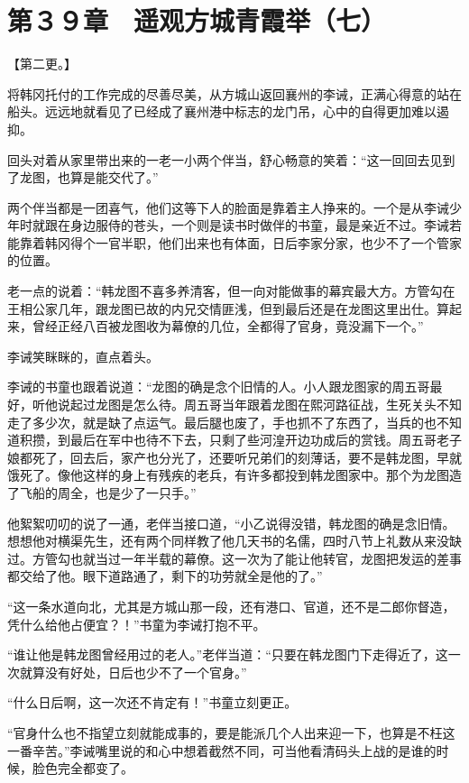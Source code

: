 \section{第３９章　遥观方城青霞举（七）}

【第二更。】

将韩冈托付的工作完成的尽善尽美，从方城山返回襄州的李诫，正满心得意的站在船头。远远地就看见了已经成了襄州港中标志的龙门吊，心中的自得更加难以遏抑。

回头对着从家里带出来的一老一小两个伴当，舒心畅意的笑着：“这一回回去见到了龙图，也算是能交代了。”

两个伴当都是一团喜气，他们这等下人的脸面是靠着主人挣来的。一个是从李诫少年时就跟在身边服侍的苍头，一个则是读书时做伴的书童，最是亲近不过。李诫若能靠着韩冈得个一官半职，他们出来也有体面，日后李家分家，也少不了一个管家的位置。

老一点的说着：“韩龙图不喜多养清客，但一向对能做事的幕宾最大方。方管勾在王相公家几年，跟龙图已故的内兄交情匪浅，但到最后还是在龙图这里出仕。算起来，曾经正经八百被龙图收为幕僚的几位，全都得了官身，竟没漏下一个。”

李诫笑眯眯的，直点着头。

李诫的书童也跟着说道：“龙图的确是念个旧情的人。小人跟龙图家的周五哥最好，听他说起过龙图是怎么待。周五哥当年跟着龙图在熙河路征战，生死关头不知走了多少次，就是缺了点运气。最后腿也废了，手也抓不了东西了，当兵的也不知道积攒，到最后在军中也待不下去，只剩了些河湟开边功成后的赏钱。周五哥老子娘都死了，回去后，家产也分光了，还要听兄弟们的刻薄话，要不是韩龙图，早就饿死了。像他这样的身上有残疾的老兵，有许多都投到韩龙图家中。那个为龙图造了飞船的周全，也是少了一只手。”

他絮絮叨叨的说了一通，老伴当接口道，“小乙说得没错，韩龙图的确是念旧情。想想他对横渠先生，还有两个同样教了他几天书的名儒，四时八节上礼数从来没缺过。方管勾也就当过一年半载的幕僚。这一次为了能让他转官，龙图把发运的差事都交给了他。眼下道路通了，剩下的功劳就全是他的了。”

“这一条水道向北，尤其是方城山那一段，还有港口、官道，还不是二郎你督造，凭什么给他占便宜？！”书童为李诫打抱不平。

“谁让他是韩龙图曾经用过的老人。”老伴当道：“只要在韩龙图门下走得近了，这一次就算没有好处，日后也少不了一个官身。”

“什么日后啊，这一次还不肯定有！”书童立刻更正。

“官身什么也不指望立刻就能成事的，要是能派几个人出来迎一下，也算是不枉这一番辛苦。”李诫嘴里说的和心中想着截然不同，可当他看清码头上战的是谁的时候，脸色完全都变了。

